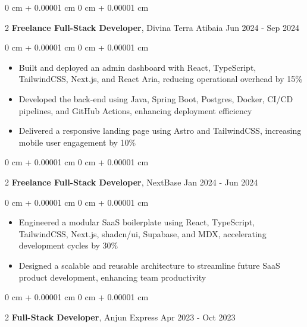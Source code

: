 \documentclass[10pt, letterpaper]{article}
\newenvironment{highlights}{ \begin{itemize}[ topsep=0.10 cm, parsep=0.10 cm, partopsep=0pt,
itemsep=0pt, leftmargin=0 cm + 10pt ] }{ \end{itemize} } %
\newenvironment{onecolentry}{ \begin{adjustwidth}{ 0 cm + 0.00001 cm }{ 0 cm + 0.00001 cm }
}{ \end{adjustwidth} } %
\newenvironment{twocolentry}[2][]{ \onecolentry \def\secondColumn{#2} \setcolumnwidth{\fill, 4.5 cm}
\begin{paracol}{2} }{ \switchcolumn \raggedleft \secondColumn \end{paracol}
\endonecolentry } %
\begin{document}
	\vspace{0.2 cm}
	
	\begin{twocolentry}
		{ Jun 2024 - Sep 2024 } \textbf{Freelance Full-Stack Developer}, Divina Terra Atibaia
	\end{twocolentry}
	
	\vspace{0.10 cm}
	\begin{onecolentry}
		\begin{highlights}
			\item Built and deployed an admin dashboard with React, TypeScript, TailwindCSS, Next.js, and React Aria, reducing operational overhead by 15\%
			\item Developed the back-end using Java, Spring Boot, Postgres, Docker, CI/CD pipelines, and GitHub Actions, enhancing deployment efficiency
			\item Delivered a responsive landing page using Astro and TailwindCSS, increasing mobile user engagement by 10\%
		\end{highlights}
	\end{onecolentry}
	
	\vspace{0.2 cm}
	
	\begin{twocolentry}
		{ Jan 2024 - Jun 2024 } \textbf{Freelance Full-Stack Developer}, NextBase
	\end{twocolentry}
	
	\vspace{0.10 cm}
	\begin{onecolentry}
		\begin{highlights}
			\item Engineered a modular SaaS boilerplate using React, TypeScript, TailwindCSS, Next.js, shadcn/ui, Supabase, and MDX, accelerating development cycles by 30\%
			\item Designed a scalable and reusable architecture to streamline future SaaS product development, enhancing team productivity
		\end{highlights}
	\end{onecolentry}
	
	\vspace{0.2 cm}
	
	\begin{twocolentry}
		{ Apr 2023 - Oct 2023 } \textbf{Full-Stack Developer}, Anjun Express
	\end{twocolentry}
	
\end{document}
